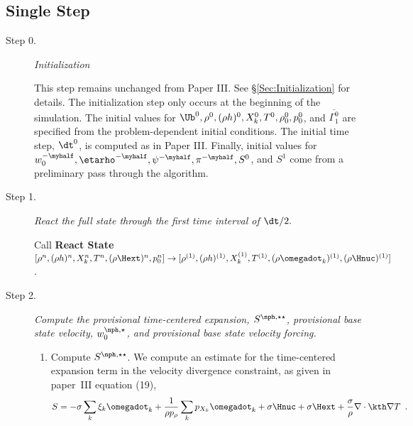 \subsection{Single Step}


\begin{description}


\item[Step 0.] {\em Initialization}

This step remains unchanged from Paper III.  See \S \ref{Sec:Initialization}
for details.  The initialization step only occurs at the beginning of the simulation.  
The initial values for $\Ub^0, \rho^0, (\rho h)^0, X_k^0, T^0, 
\rho_0^0, p_0^0$, and $\overline{\Gamma_1^0}$ are specified from the problem-dependent 
initial conditions.  The initial time step, $\dt^0$, is computed as in 
Paper III.  Finally, initial
values for $w_0^{-\myhalf}, \etarho^{-\myhalf}, \psi^{-\myhalf}, 
\pi^{-\myhalf}, S^0$, and $S^1$ come from a preliminary pass through
the algorithm.  

\item[Step 1.] {\em React the full state through the first time interval of $\dt / 2.$}

Call {\bf React State}$[\rho^n, (\rho h)^n, X_k^n, T^n, (\rho\Hext)^n, p_0^n]
 \rightarrow [\rho^{(1)},(\rho h)^{(1)},X_k^{(1)},T^{(1)},(\rho \omegadot_k)^{(1)},(\rho \Hnuc)^{(1)}]$.


\item[Step 2.] {\em Compute the provisional time-centered expansion,
  $S^{\nph,\star\star}$, provisional base state velocity,
  $w_0^{\nph,\star}$, and provisional base state velocity forcing.}

\begin{enumerate}
\renewcommand{\theenumi}{{\bf \Alph{enumi}}}

\item Compute $S^{\nph,\star\star}$.  We compute an estimate for the
  time-centered expansion term in the velocity divergence constraint,
  as given in paper~III equation (19),
\begin{equation}
  S =  -\sigma  \sum_k  \xi_k \omegadot_k  + 
  \frac{1}{\rho p_\rho} \sum_k p_{X_k}  {\omegadot}_k  + \sigma \Hnuc + \sigma \Hext 
  + \frac{\sigma}{\rho}\nabla\cdot\kth\nabla T \enskip .
\label{eq:defineS} 
\end{equation}


\end{enumerate}
\end{description}

